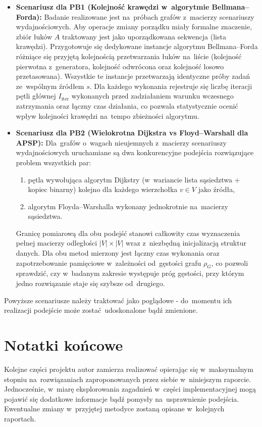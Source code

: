 \documentclass[11pt,a4paper,oneside]{report}
\begin{document}
\begin{itemize}
  \item \textbf{Scenariusz dla PB1 (Kolejność krawędzi w~algorytmie Bellmana--Forda):}
    Badanie realizowane jest na~próbach grafów z~macierzy scenariuszy wydajnościowych. Aby operacje zmiany porządku miały formalne znaczenie, zbiór łuków $A$ traktowany jest jako uporządkowana sekwencja (lista krawędzi). Przygotowuje się dedykowane instancje algorytmu Bellmana--Forda różniące się przyjętą kolejnością przetwarzania łuków na~liście (kolejność pierwotna z~generatora, kolejność odwrócona oraz kolejność losowo przetasowana). Wszystkie te instancje przetwarzają identyczne próby zadań ze~wspólnym źródłem $s$. Dla każdego wykonania rejestruje się liczbę iteracji pętli głównej $I_{\mathrm{iter}}$ wykonanych przed zadziałaniem warunku wczesnego zatrzymania oraz łączny czas działania, co pozwala statystycznie ocenić wpływ kolejności krawędzi na~tempo zbieżności algorytmu.

  \item \textbf{Scenariusz dla PB2 (Wielokrotna Dijkstra vs Floyd--Warshall dla APSP):}
    Dla~grafów o~wagach nieujemnych z~macierzy scenariuszy wydajnościowych uruchamiane są dwa konkurencyjne podejścia rozwiązujące problem wszystkich par:
    \begin{enumerate}
      \item pętla wywołująca algorytm Dijkstry (w~wariancie lista sąsiedztwa + kopiec binarny) kolejno dla każdego wierzchołka $v \in V$ jako źródła,
      \item algorytm Floyda--Warshalla wykonany jednokrotnie na~macierzy sąsiedztwa.
    \end{enumerate}
    Granicę pomiarową dla obu podejść stanowi całkowity czas wyznaczenia pełnej macierzy odległości $|V| \times |V|$ wraz z~niezbędną inicjalizacją struktur danych. Dla obu metod mierzony jest łączny czas wykonania oraz zapotrzebowanie pamięciowe w~zależności od~gęstości grafu $\rho_G$, co pozwoli sprawdzić, czy w~badanym zakresie występuje próg gęstości, przy którym jedno rozwiązanie staje się szybsze od~drugiego.
\end{itemize}
Powyższe scenariusze należy traktować jako poglądowe - do~momentu ich realizacji podejście może zostać udoskonalone bądź zmienione.



\section{Notatki końcowe}

Kolejne części projektu autor zamierza realizować opierając się w~maksymalnym stopniu na~rozwiązaniach zaproponowanych przez siebie w~niniejszym raporcie. Jednocześnie, w~miarę eksplorowania zagadnień w~części implementacyjnej mogą pojawić się dodatkowe informacje bądź pomysły na~usprawnienie podejścia. Ewentualne zmiany w~przyjętej metodyce zostaną opisane w~kolejnych raportach.



\end{document}
